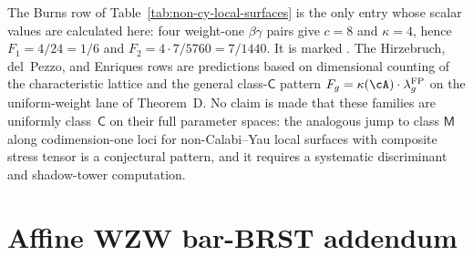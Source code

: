 \begin{remark}
\label{rem:non-cy-scope}
The Burns row of Table~\ref{tab:non-cy-local-surfaces} is the only
entry whose scalar values are calculated here: four weight-one
$\beta\gamma$ pairs give $c=8$ and $\kappa=4$, hence
$F_1=4/24=1/6$ and $F_2=4\cdot7/5760=7/1440$.  It is marked
\ClaimStatusProvedElsewhere{}. The
Hirzebruch, del~Pezzo, and Enriques rows are
\ClaimStatusConjectured{} predictions based on dimensional counting
of the characteristic lattice and the general class-$\mathsf{C}$
pattern $F_g = \kappa(\cA) \cdot \lambda_g^{\mathrm{FP}}$ on the
uniform-weight lane of Theorem~D.
No claim is made that these families are uniformly class~$\mathsf{C}$
on their full parameter spaces: the analogous jump to class
$\mathsf{M}$ along codimension-one loci for non-Calabi--Yau local
surfaces with composite stress tensor is a conjectural pattern, and it
requires a systematic discriminant and shadow-tower computation.
\end{remark}

\section{Affine WZW bar-BRST addendum}

